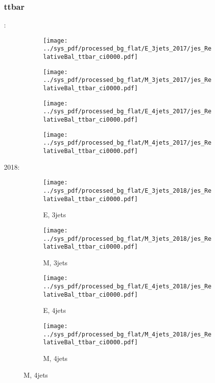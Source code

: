 \documentclass{beamer}
\begin{document}
\begin{frame}
\frametitle{ttbar}
\fontsize{5}{1}:
\begin{figure}
\centering
\begin{subfigure}[b]{0.24\textwidth}
\texttt{[image: ../sys\_pdf/processed\_bg\_flat/E\_3jets\_2017/jes\_RelativeBal\_ttbar\_ci0000.pdf]}
\end{subfigure}
\begin{subfigure}[b]{0.24\textwidth}
\texttt{[image: ../sys\_pdf/processed\_bg\_flat/M\_3jets\_2017/jes\_RelativeBal\_ttbar\_ci0000.pdf]}
\end{subfigure}
\begin{subfigure}[b]{0.24\textwidth}
\texttt{[image: ../sys\_pdf/processed\_bg\_flat/E\_4jets\_2017/jes\_RelativeBal\_ttbar\_ci0000.pdf]}
\end{subfigure}
\begin{subfigure}[b]{0.24\textwidth}
\texttt{[image: ../sys\_pdf/processed\_bg\_flat/M\_4jets\_2017/jes\_RelativeBal\_ttbar\_ci0000.pdf]}
\end{subfigure}
\end{figure}
2018:
\begin{figure}
\centering
\begin{subfigure}[b]{0.24\textwidth}
\texttt{[image: ../sys\_pdf/processed\_bg\_flat/E\_3jets\_2018/jes\_RelativeBal\_ttbar\_ci0000.pdf]}
\captionsetup{font=tiny}
\caption{E, 3jets}
\end{subfigure}
\begin{subfigure}[b]{0.24\textwidth}
\texttt{[image: ../sys\_pdf/processed\_bg\_flat/M\_3jets\_2018/jes\_RelativeBal\_ttbar\_ci0000.pdf]}
\captionsetup{font=tiny}
\caption{M, 3jets}
\end{subfigure}
\begin{subfigure}[b]{0.24\textwidth}
\texttt{[image: ../sys\_pdf/processed\_bg\_flat/E\_4jets\_2018/jes\_RelativeBal\_ttbar\_ci0000.pdf]}
\captionsetup{font=tiny}
\caption{E, 4jets}
\end{subfigure}
\begin{subfigure}[b]{0.24\textwidth}
\texttt{[image: ../sys\_pdf/processed\_bg\_flat/M\_4jets\_2018/jes\_RelativeBal\_ttbar\_ci0000.pdf]}
\captionsetup{font=tiny}
\caption{M, 4jets}
\end{subfigure}
\end{figure}
\end{frame}
\end{document}
